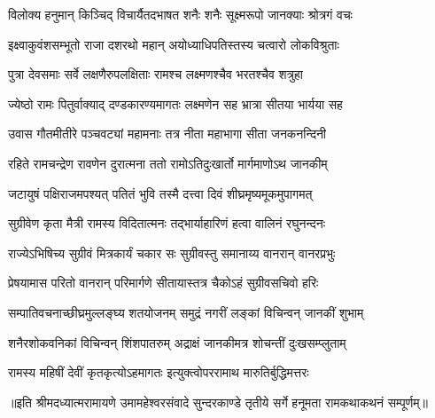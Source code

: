 


\addtocounter{shlokacount}{11}

\twolineshloka
{विलोक्य हनुमान् किञ्चिद् विचार्यैतदभाषत}
{शनैः शनैः सूक्ष्मरूपो जानक्याः श्रोत्रगं वचः} %

\twolineshloka
{इक्ष्वाकुवंशसम्भूतो राजा दशरथो महान्}
{अयोध्याधिपतिस्तस्य चत्वारो लोकविश्रुताः} %

\twolineshloka
{पुत्रा देवसमाः सर्वे लक्षणैरुपलक्षिताः}
{रामश्च लक्ष्मणश्चैव भरतश्चैव शत्रुहा} %

\twolineshloka
{ज्येष्ठो रामः पितुर्वाक्याद् दण्डकारण्यमागतः}
{लक्ष्मणेन सह भ्रात्रा सीतया भार्यया सह} %

\twolineshloka
{उवास गौतमीतीरे पञ्चवट्यां महामनाः}
{तत्र नीता महाभागा सीता जनकनन्दिनी} %

\twolineshloka
{रहिते रामचन्द्रेण रावणेन दुरात्मना}
{ततो रामोऽतिदुःखार्तो मार्गमाणोऽथ जानकीम्} %

\twolineshloka
{जटायुषं पक्षिराजमपश्यत् पतितं भुवि}
{तस्मै दत्त्वा दिवं शीघ्रमृष्यमूकमुपागमत्} %

\twolineshloka
{सुग्रीवेण कृता मैत्री रामस्य विदितात्मनः}
{तद्भार्याहारिणं हत्वा वालिनं रघुनन्दनः} %

\twolineshloka
{राज्येऽभिषिच्य सुग्रीवं मित्रकार्यं चकार सः}
{सुग्रीवस्तु समानाय्य वानरान् वानरप्रभुः} %

\twolineshloka
{प्रेषयामास परितो वानरान् परिमार्गणे}
{सीतायास्तत्र चैकोऽहं सुग्रीवसचिवो हरिः} %

\twolineshloka
{सम्पातिवचनाच्छीघ्रमुल्लङ्घ्य शतयोजनम्}
{समुद्रं नगरीं लङ्कां विचिन्वन् जानकीं शुभाम्} %

\twolineshloka
{शनैरशोकवनिकां विचिन्वन् शिंशपातरुम्}
{अद्राक्षं जानकीमत्र शोचन्तीं दुःखसम्प्लुताम्} %

\twolineshloka
{रामस्य महिषीं देवीं कृतकृत्योऽहमागतः}
{इत्युक्त्वोपररामाथ मारुतिर्बुद्धिमत्तरः} %

{॥इति श्रीमदध्यात्मरामायणे उमामहेश्वरसंवादे  सुन्दरकाण्डे
तृतीये सर्गे हनूमता  रामकथाकथनं सम्पूर्णम्॥}
